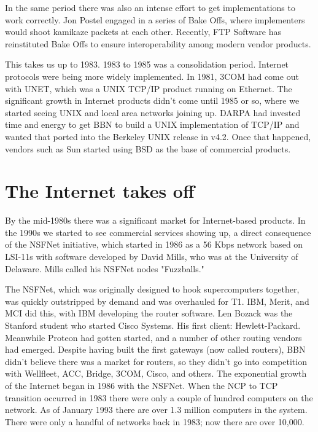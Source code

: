 \documentclass[10pt,a4paper]{scrartcl}
\begin{document}
In the same period there was also an intense effort to get implementations to work correctly. Jon Postel engaged in a series of Bake Offs, where implementers would shoot kamikaze packets at each other. Recently, FTP Software has reinstituted Bake Offs to ensure interoperability among modern vendor products.

This takes us up to 1983. 1983 to 1985 was a consolidation period. Internet protocols were being more widely implemented. In 1981, 3COM had come out with UNET, which was a UNIX TCP/IP product running on Ethernet. The significant growth in Internet products didn't come until 1985 or so, where we started seeing UNIX and local area networks joining up. DARPA had invested time and energy to get BBN to build a UNIX implementation of TCP/IP and wanted that ported into the Berkeley UNIX release in v4.2. Once that happened, vendors such as Sun started using BSD as the base of commercial products.


{\section {The Internet takes off}}

By the mid-1980s there was a significant market for Internet-based products. In the 1990s we started to see commercial services showing up, a direct consequence of the NSFNet initiative, which started in 1986 as a 56 Kbps network based on LSI-11s with software developed by David Mills, who was at the University of Delaware. Mills called his NSFNet nodes "Fuzzballs."

The NSFNet, which was originally designed to hook supercomputers together, was quickly outstripped by demand and was overhauled for T1. IBM, Merit, and MCI did this, with IBM developing the router software. Len Bozack was the Stanford student who started Cisco Systems. His first client: Hewlett-Packard. Meanwhile Proteon had gotten started, and a number of other routing vendors had emerged. Despite having built the first gateways (now called routers), BBN didn't believe there was a market for routers, so they didn't go into competition with Wellfleet, ACC, Bridge, 3COM, Cisco, and others. The exponential growth of the Internet began in 1986 with the NSFNet. When the NCP to TCP transition occurred in 1983 there were only a couple of hundred computers on the network. As of January 1993 there are over 1.3 million computers in the system. There were only a handful of networks back in 1983; now there are over 10,000.
\end{document}

